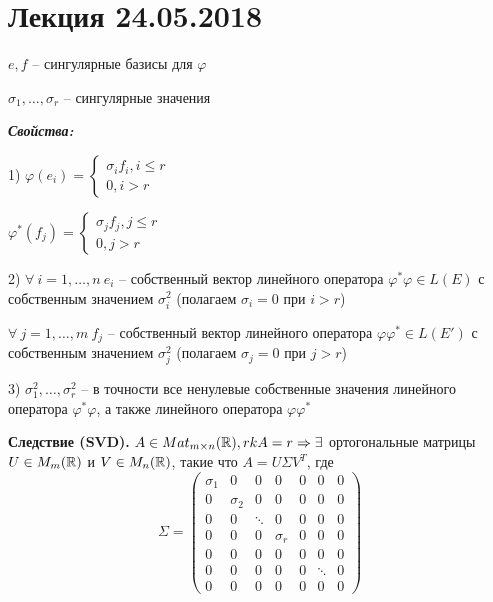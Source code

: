 \section{Лекция 24.05.2018}

$e, f$ -- сингулярные базисы для $\varphi$

$\sigma_1, \dots, \sigma_r$ -- сингулярные значения

\vspace{\baselineskip}
\textbf{\textit{Свойства:}}

1) $\varphi(e_i) = \begin{cases} \sigma_i f_i, i \leqslant r \\ 0, i > r \end{cases}$

$\varphi^*(f_j) = \begin{cases} \sigma_j f_j, j \leqslant r \\ 0, j > r \end{cases}$

\vspace{\baselineskip}
2) $\forall \ i = 1, \dots, n \ e_i$ -- собственный вектор линейного оператора $\varphi^* \varphi \in L(E)$ с собственным значением $\sigma_i^2$ (полагаем $\sigma_i = 0$ при $i > r$) 

$\forall \ j = 1, \dots, m \ f_j$ -- собственный вектор линейного оператора $\varphi \varphi^* \in L(E')$ с собственным значением $\sigma_j^2$ (полагаем $\sigma_j = 0$ при $j > r$) 

\vspace{\baselineskip}
3) $\sigma_1^2, \dots, \sigma_r^2$ -- в точности все ненулевые собственные значения линейного оператора $\varphi^* \varphi$, а также линейного оператора $\varphi \varphi^*$

\vspace{\baselineskip}
\textbf{Следствие (SVD).} $A \in Mat_{m \times n} (\mathbb{R}), rkA = r \Rightarrow \exists$ ортогональные матрицы $U \in M_m(\mathbb{R})$ и $V \in M_n(\mathbb{R})$, такие что $A = U \Sigma V^T$, где \begin{equation*}\Sigma = \begin{pmatrix} \sigma_1 & 0 & 0 & 0 & 0 & 0 & 0 \\  0 & \sigma_2 & 0 & 0 & 0 & 0 & 0 \\ 0 & 0 & \ddots & 0 & 0 & 0 & 0 \\ 0 & 0 & 0 & \sigma_r & 0 & 0 & 0 \\ 0 & 0 & 0 & 0 & 0 & 0 & 0 \\ 0 & 0 & 0 & 0 & 0 & \ddots & 0 \\ 0 & 0 & 0 & 0 & 0 & 0 & 0 \end{pmatrix}\end{equation*}

